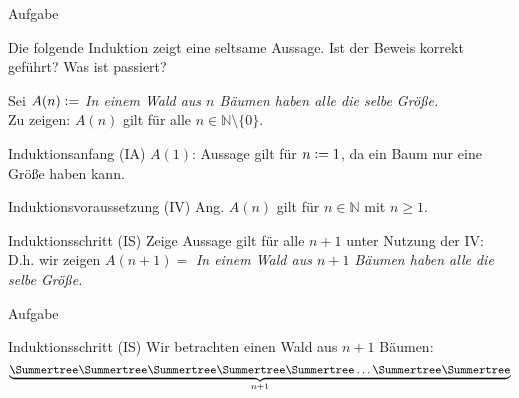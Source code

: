%
%
%
%

{
\begin{frame}[fragile]{Aufgabe}
    \begin{alertblock}{Die folgende Induktion zeigt eine seltsame Aussage.}
        Ist der Beweis korrekt geführt? Was ist passiert?
    \end{alertblock}
    Sei $A(n)\vcentcolon=$ \emph{In einem Wald aus $n$ Bäumen haben alle die selbe Größe.}\\
    Zu zeigen: $A(n)$ gilt für alle $n \in \mathbb{N} \setminus \{0\} $.
    \begin{alertblock}{Induktionsanfang (IA)}
        $A(1)$: Aussage gilt für $n\vcentcolon= 1$, da ein Baum nur eine Größe haben kann.
    \end{alertblock}
    \begin{alertblock}{Induktionsvoraussetzung (IV)}
        Ang. $A(n)$ gilt für $n\in\mathbb{N}$ mit $n\geq1$.
    \end{alertblock}
    \begin{alertblock}{Induktionsschritt (IS)}
        Zeige Aussage gilt für alle $n+1$ unter Nutzung der IV:\\
        D.h. wir zeigen $A(n+1)=$ \emph{In einem Wald aus $n+1$ Bäumen haben alle die selbe Größe.}
    \end{alertblock}
\end{frame}
\begin{frame}[fragile]{Aufgabe}
    \footnotesize{
        \begin{alertblock}{Induktionsschritt (IS)}
            Wir betrachten einen Wald aus $n+1$ Bäumen:
            \[\underbrace{\text{\Summertree}\text{\Summertree}\text{\Summertree}\text{\Summertree}\text{\Summertree}\dots\text{\Summertree}\text{\Summertree}}_{n+1}\]

\end{alertblock}}
\end{frame}}
